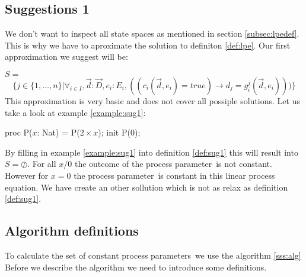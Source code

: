 \documentclass[a4paper,10pt]{article}
\newcommand{\lpe}{linear process equation}
\newcommand{\ovr}{\overrightarrow}
\newcommand{\pp}{process parameter}
\newcommand{\pps}{process parameters}
\begin{document}
\subsection{Suggestions 1}
We don't want to inspect all state spaces as mentioned in section \ref{subsec:lpedef}. This is why we have to aproximate the solution to definiton \ref{def:lpe}. Our first approximation we suggest will be:
\begin{defn} \label{def:sug1}
\label{defn:const}$S=$
\begin{displaymath}
\lbrace   
j \in \lbrace 1, \ldots , n \rbrace \vert \forall_{i\in I}, \ovr{d}: \ovr{D} , e_i: E_i, ((c_i(\ovr{d},e_i) = true)  \rightarrow d_j = g_i^j(\ovr{d},e_i)))\rbrace
\end{displaymath}
This approximation is very basic and does not cover all possiple solutions. Let us take a look at example \ref{example:sug1}:
\begin{example} \label{example:sug1}
proc P($x$: Nat) = P($2 \times x$);
init P(0);
\end{example}
By filling in example \ref{example:sug1} into definition \ref{def:sug1} this will result into $S = \oslash$. For all $x / 0 $ the outcome of the \pp\ is not constant. However for $x=0$ the \pp\ is constant in this \lpe . We have create an other sollution which is not as relax as definition \ref{def:sug1}.

\end{defn}

\subsection{Algorithm definitions}
To calculate the set of constant \pps\ we use the algorithm
\ref{sss:alg} Before we describe the algorithm we need to introduce
some definitions. 
\end{document}
